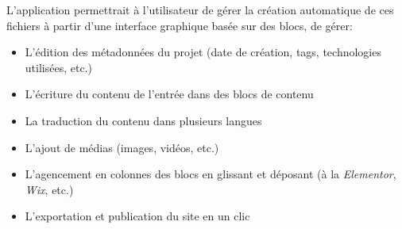 \documentclass{article}
\begin{document}
L'application permettrait à l'utilisateur de gérer la création automatique de ces fichiers à partir d'une interface graphique basée sur des blocs, de gérer:

\begin{itemize}
    \item L'édition des métadonnées du projet (date de création, tags, technologies utilisées, etc.)
    \item L'écriture du contenu de l'entrée dans des blocs de contenu
    \item La traduction du contenu dans plusieurs langues
    \item L'ajout de médias (images, vidéos, etc.)
    \item L'agencement en colonnes des blocs en glissant et déposant (à la \emph{Elementor}, \emph{Wix}, etc.)
    \item L'exportation et publication du site en un clic
\end{itemize}
\end{document}
